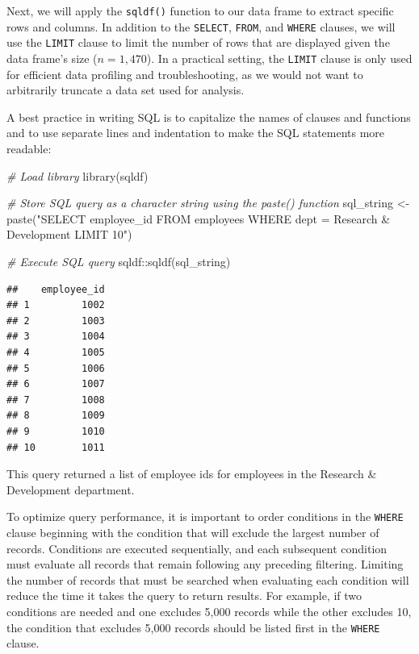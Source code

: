 \documentclass[
]{book}
\newenvironment{Shaded}{\begin{snugshade}}{\end{snugshade}}
\newcommand{\CommentTok}[1]{\textcolor[rgb]{0.56,0.35,0.01}{\textit{#1}}}
\newcommand{\FunctionTok}[1]{\textcolor[rgb]{0.00,0.00,0.00}{#1}}
\newcommand{\NormalTok}[1]{#1}
\newcommand{\OtherTok}[1]{\textcolor[rgb]{0.56,0.35,0.01}{#1}}
\newcommand{\SpecialCharTok}[1]{\textcolor[rgb]{0.00,0.00,0.00}{#1}}
\newcommand{\StringTok}[1]{\textcolor[rgb]{0.31,0.60,0.02}{#1}}
\begin{document}
Next, we will apply the \texttt{sqldf()} function to our data frame to extract specific rows and columns. In addition to the \texttt{SELECT}, \texttt{FROM}, and \texttt{WHERE} clauses, we will use the \texttt{LIMIT} clause to limit the number of rows that are displayed given the data frame's size (\(n = 1,470\)). In a practical setting, the \texttt{LIMIT} clause is only used for efficient data profiling and troubleshooting, as we would not want to arbitrarily truncate a data set used for analysis.

A best practice in writing SQL is to capitalize the names of clauses and functions and to use separate lines and indentation to make the SQL statements more readable:

\begin{Shaded}
\begin{Highlighting}[]
\CommentTok{\# Load library}
\FunctionTok{library}\NormalTok{(sqldf)}

\CommentTok{\# Store SQL query as a character string using the paste() function}
\NormalTok{sql\_string }\OtherTok{\textless{}{-}} \FunctionTok{paste}\NormalTok{(}\StringTok{"SELECT}
\StringTok{                      employee\_id}
\StringTok{                    FROM}
\StringTok{                      employees}
\StringTok{                    WHERE}
\StringTok{                      dept = \textquotesingle{}Research \& Development\textquotesingle{}}
\StringTok{                    LIMIT 10"}\NormalTok{)}

\CommentTok{\# Execute SQL query}
\NormalTok{sqldf}\SpecialCharTok{::}\FunctionTok{sqldf}\NormalTok{(sql\_string)}
\end{Highlighting}
\end{Shaded}

\begin{verbatim}
##    employee_id
## 1         1002
## 2         1003
## 3         1004
## 4         1005
## 5         1006
## 6         1007
## 7         1008
## 8         1009
## 9         1010
## 10        1011
\end{verbatim}

This query returned a list of employee ids for employees in the Research \& Development department.

To optimize query performance, it is important to order conditions in the \texttt{WHERE} clause beginning with the condition that will exclude the largest number of records. Conditions are executed sequentially, and each subsequent condition must evaluate all records that remain following any preceding filtering. Limiting the number of records that must be searched when evaluating each condition will reduce the time it takes the query to return results. For example, if two conditions are needed and one excludes 5,000 records while the other excludes 10, the condition that excludes 5,000 records should be listed first in the \texttt{WHERE} clause.
\end{document}

